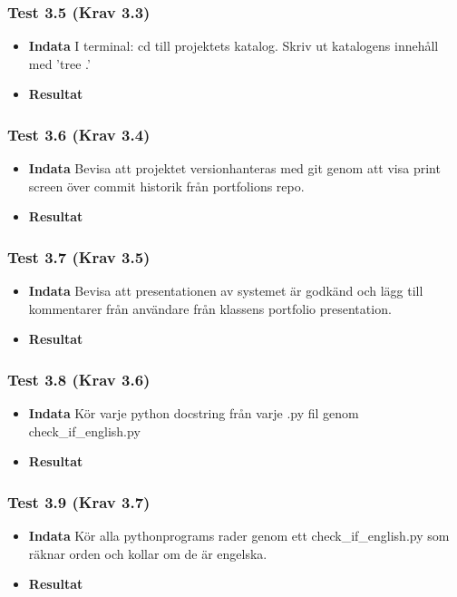 \documentclass{TDP003mall}
\begin{document}
\subsubsection*{Test 3.5 (Krav 3.3)}
\begin{itemize}
\item[]\textbf{Indata} I terminal: cd till projektets katalog. Skriv ut katalogens innehåll med 'tree .'
\item[]\textbf{Resultat} 
\end{itemize}
\subsubsection*{Test 3.6 (Krav 3.4)}
\begin{itemize}
\item[]\textbf{Indata} Bevisa att projektet versionhanteras med git genom att visa print screen över commit historik från portfolions repo.
\item[]\textbf{Resultat} 
\end{itemize}
\subsubsection*{Test 3.7 (Krav 3.5)}
\begin{itemize}
\item[]\textbf{Indata} Bevisa att presentationen av systemet är godkänd och lägg till kommentarer från användare från klassens portfolio presentation.
\item[]\textbf{Resultat} 
\end{itemize}
\subsubsection*{Test 3.8 (Krav 3.6)}
\begin{itemize}
\item[]\textbf{Indata} Kör varje python docstring från varje .py fil genom check\_if\_english.py
\item[]\textbf{Resultat} 
\end{itemize}
\subsubsection*{Test 3.9 (Krav 3.7)}
\begin{itemize}
\item[]\textbf{Indata} Kör alla pythonprograms rader genom ett check\_if\_english.py som räknar orden och kollar om de är engelska. 
\item[]\textbf{Resultat} 
\end{itemize}
\end{document}
